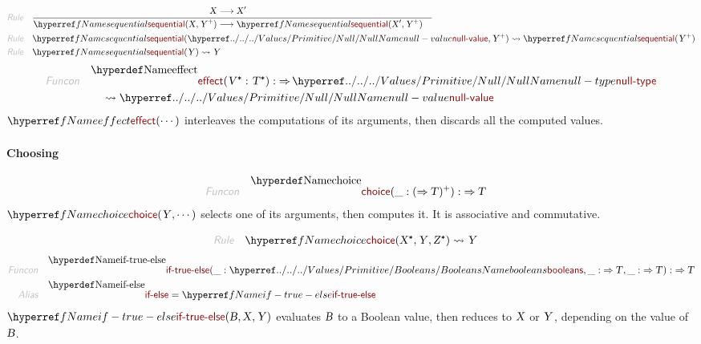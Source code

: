 \begin{align*}
  \KEY{Rule} \quad
    & \RULE{
      &  \VAR{X} \TRANS 
          \VAR{X}'
      }{
      &  \NAMEREF{sequential}
                      (  \VAR{X}, 
                             \VAR{Y}\PLUS ) \TRANS 
          \NAMEREF{sequential}
            (  \VAR{X}', 
                   \VAR{Y}\PLUS )
      }
\\
  \KEY{Rule} \quad
    & \NAMEREF{sequential}
        (  \NAMEHYPER{../../../Values/Primitive}{Null}{null-value}, 
               \VAR{Y}\PLUS ) \leadsto 
        \NAMEREF{sequential}
          (  \VAR{Y}\PLUS )
\\
  \KEY{Rule} \quad
    & \NAMEREF{sequential}
        (  \VAR{Y} ) \leadsto 
        \VAR{Y}
\end{align*}
\begin{align*}
  \KEY{Funcon} \quad
  & \NAMEDECL{effect}(
                       \VAR{V}\STAR : \VAR{T}\STAR) 
    :  \TO \NAMEHYPER{../../../Values/Primitive}{Null}{null-type} \\&\quad
    \leadsto \NAMEHYPER{../../../Values/Primitive}{Null}{null-value}
\end{align*}
$\SHADE{\NAMEREF{effect}
           (  \cdots )}$ interleaves the computations of its arguments, then discards
  all the computed values.

\paragraph{Choosing}\hypertarget{choosing}{}\label{choosing}

\begin{align*}
  \KEY{Funcon} \quad
  & \NAMEDECL{choice}(
                       \_ : (   \TO \VAR{T} )\PLUS) 
    :  \TO \VAR{T} 
\end{align*}
$\SHADE{\NAMEREF{choice}
           (  \VAR{Y}, 
                  \cdots )}$ selects one of its arguments, then computes it.
  It is associative and commutative.

\begin{align*}
  \KEY{Rule} \quad
    & \NAMEREF{choice}
        (  \VAR{X}\STAR, 
               \VAR{Y}, 
               \VAR{Z}\STAR ) \leadsto 
        \VAR{Y}
\end{align*}
\begin{align*}
  \KEY{Funcon} \quad
  & \NAMEDECL{if-true-else}(
                       \_ : \NAMEHYPER{../../../Values/Primitive}{Booleans}{booleans}, \_ :  \TO \VAR{T}, \_ :  \TO \VAR{T}) 
    :  \TO \VAR{T} 
\\
  \KEY{Alias} \quad
  & \NAMEDECL{if-else} = \NAMEREF{if-true-else}
\end{align*}
$\SHADE{\NAMEREF{if-true-else}
           (  \VAR{B}, 
                  \VAR{X}, 
                  \VAR{Y} )}$ evaluates $\SHADE{\VAR{B}}$ to a Boolean value, then reduces
  to $\SHADE{\VAR{X}}$ or $\SHADE{\VAR{Y}}$, depending on the value of $\SHADE{\VAR{B}}$.


